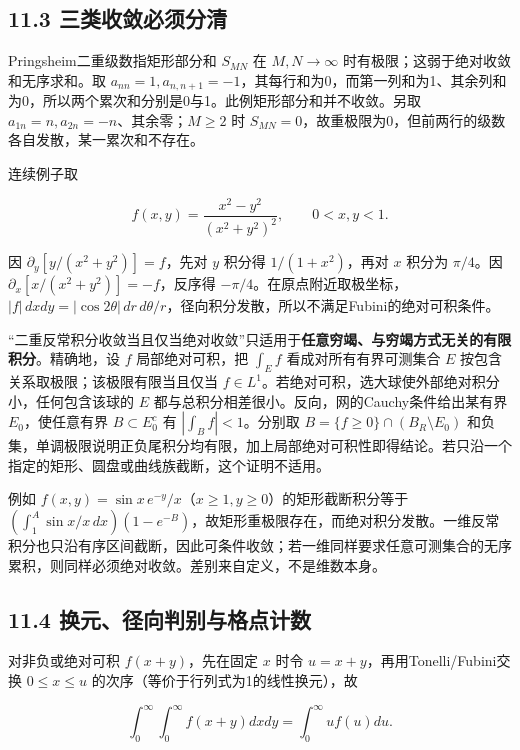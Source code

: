 \documentclass[11pt,a4paper]{article}
\begin{document}
\subsection{11.3
三类收敛必须分清}\label{ux4e09ux7c7bux6536ux655bux5fc5ux987bux5206ux6e05}

Pringsheim二重级数指矩形部分和 \(S_{MN}\) 在 \(M,N\to\infty\)
时有极限；这弱于绝对收敛和无序求和。取
\(a_{nn}=1,a_{n,n+1}=-1\)，其每行和为0，而第一列和为1、其余列和为0，所以两个累次和分别是0与1。此例矩形部分和并不收敛。另取
\(a_{1n}=n,a_{2n}=-n\)、其余零；\(M\ge2\) 时
\(S_{MN}=0\)，故重极限为0，但前两行的级数各自发散，某一累次和不存在。

连续例子取

\[
f(x,y)=\frac{x^2-y^2}{(x^2+y^2)^2},\qquad 0<x,y<1.
\]

因 \(\partial_y[y/(x^2+y^2)]=f\)，先对 \(y\) 积分得 \(1/(1+x^2)\)，再对
\(x\) 积分为 \(\pi/4\)。因 \(\partial_x[x/(x^2+y^2)]=-f\)，反序得
\(-\pi/4\)。在原点附近取极坐标，\(|f|\,dxdy=|\cos2\theta|\,dr\,d\theta/r\)，径向积分发散，所以不满足Fubini的绝对可积条件。

``二重反常积分收敛当且仅当绝对收敛''只适用于\textbf{任意穷竭、与穷竭方式无关的有限积分}。精确地，设
\(f\) 局部绝对可积，把 \(\int_Ef\) 看成对所有有界可测集合 \(E\)
按包含关系取极限；该极限有限当且仅当
\(f\in L^1\)。若绝对可积，选大球使外部绝对积分小，任何包含该球的 \(E\)
都与总积分相差很小。反向，网的Cauchy条件给出某有界 \(E_0\)，使任意有界
\(B\subset E_0^c\) 有 \(|\int_Bf|<1\)。分别取
\(B=\{f\ge0\}\cap(B_R\setminus E_0)\)
和负集，单调极限说明正负尾积分均有限，加上局部绝对可积性即得结论。若只沿一个指定的矩形、圆盘或曲线族截断，这个证明不适用。

例如 \(f(x,y)=\sin x\,e^{-y}/x\)（\(x\ge1,y\ge0\)）的矩形截断积分等于
\((\int_1^A\sin x/x\,dx)(1-e^{-B})\)，故矩形重极限存在，而绝对积分发散。一维反常积分也只沿有序区间截断，因此可条件收敛；若一维同样要求任意可测集合的无序累积，则同样必须绝对收敛。差别来自定义，不是维数本身。

\subsection{11.4
换元、径向判别与格点计数}\label{ux6362ux5143ux5f84ux5411ux5224ux522bux4e0eux683cux70b9ux8ba1ux6570}

对非负或绝对可积 \(f(x+y)\)，先在固定 \(x\) 时令
\(u=x+y\)，再用Tonelli/Fubini交换 \(0\le x\le u\)
的次序（等价于行列式为1的线性换元），故

\[
\int_0^\infty\!\int_0^\infty f(x+y)dxdy
=\int_0^\infty uf(u)du.
\]
\end{document}
